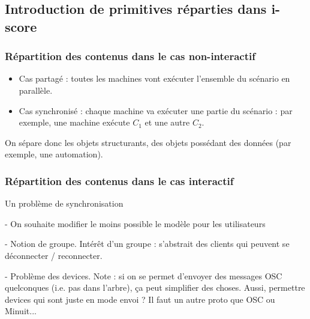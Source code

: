 \documentclass{article}
\begin{document}
\subsection{Introduction de primitives réparties dans i-score}

\subsubsection{Répartition des contenus dans le cas non-interactif}
\begin{figure}[h]
    \centering
    \begin{tikzpicture}
    
    \end{tikzpicture}
    \label{scenar.simple}
\end{figure}

\begin{itemize}
    \item Cas partagé : toutes les machines vont exécuter l'ensemble du scénario en parallèle.
    \item Cas synchronisé : chaque machine va exécuter une partie du scénario : par exemple, une machine exécute $C_1$ et une autre $C_2$.
\end{itemize}

On sépare donc les objets structurants, des objets possédant des données (par exemple, une automation).


\subsubsection{Répartition des contenus dans le cas interactif}
\begin{figure}[h]
    \centering
    \begin{tikzpicture}
    
    \end{tikzpicture}
    \label{scenar.general}
\end{figure}

Un problème de synchronisation

- On souhaite modifier le moins possible le modèle pour les utilisateurs

- Notion de groupe. Intérêt d'un groupe : s'abstrait des clients qui peuvent se déconnecter / reconnecter.

- Problème des devices. Note : si on se permet d'envoyer des messages OSC quelconques (i.e. pas dans l'arbre), ça peut simplifier des choses. Aussi, permettre devices qui sont juste en mode envoi ? Il faut un autre proto que OSC ou Minuit...
\end{document}
